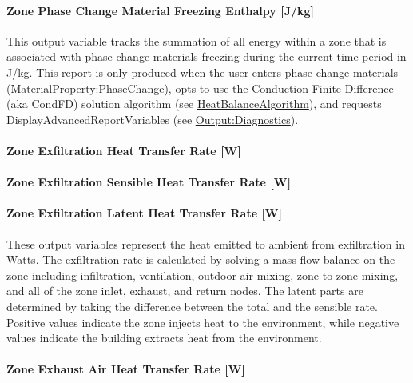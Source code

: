 \paragraph{Zone Phase Change Material Freezing Enthalpy {[}J/kg{]}}\label{zone-phase-change-material-freezing-enthalpy-jkg}

This output variable tracks the summation of all energy within a zone that is associated with phase change materials freezing during the current time period in J/kg.  This report is only produced when the user enters phase change materials (\hyperref[materialpropertyphasechange]{MaterialProperty:PhaseChange}), opts to use the Conduction Finite Difference (aka CondFD) solution algorithm (see \hyperref[heatbalancealgorithm]{HeatBalanceAlgorithm}), and requests DisplayAdvancedReportVariables (see \hyperref[outputdiagnostics]{Output:Diagnostics}).

\paragraph{Zone Exfiltration Heat Transfer Rate {[}W{]}}\label{zone-exfiltration-heat-transfer-rate-w}

\paragraph{Zone Exfiltration Sensible Heat Transfer Rate {[}W{]}}\label{zone-exfiltration-sensible-heat-transfer-rate-w}

\paragraph{Zone Exfiltration Latent Heat Transfer Rate {[}W{]}}\label{zone-exfiltration-latent-heat-transfer-rate-w}

These output variables represent the heat emitted to ambient from exfiltration in Watts. The exfiltration rate is calculated by solving a mass flow balance on the zone including infiltration, ventilation, outdoor air mixing, zone-to-zone mixing, and all of the zone inlet, exhaust, and return nodes. The latent parts are determined by taking the difference between the total and the sensible rate. Positive values indicate the zone injects heat to the environment, while negative values indicate the building extracts heat from the environment.

\paragraph{Zone Exhaust Air Heat Transfer Rate {[}W{]}}\label{zone-exhaust-heat-transfer-rate-w}

